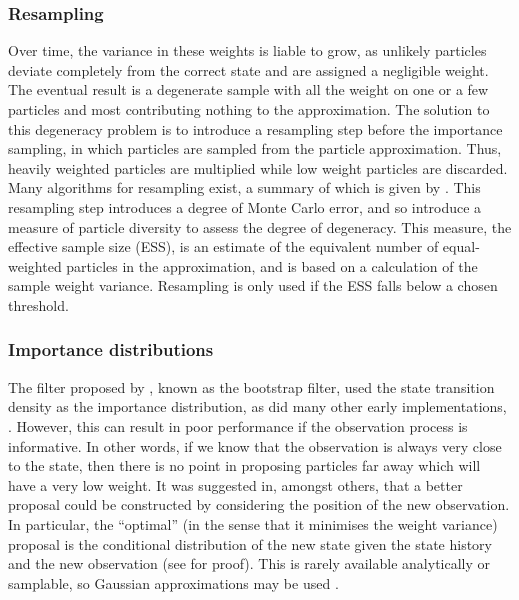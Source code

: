 \subsubsection{Resampling}
Over time, the variance in these weights is liable to grow, as unlikely particles deviate completely from the correct state and are assigned a negligible weight. The eventual result is a degenerate sample with all the weight on one or a few particles and most contributing nothing to the approximation. The solution to this degeneracy problem is to introduce a resampling step before the importance sampling, in which particles are sampled from the particle approximation. Thus, heavily weighted particles are multiplied while low weight particles are discarded. Many algorithms for resampling exist, a summary of which is given by \cite{Doucet2009}. This resampling step introduces a degree of Monte Carlo error, and so \cite{Liu1995} introduce a measure of particle diversity to assess the degree of degeneracy. This measure, the effective sample size (ESS), is an estimate of the equivalent number of equal-weighted particles in the approximation, and is based on a calculation of the sample weight variance. Resampling is only used if the ESS falls below a chosen threshold.

\subsubsection{Importance distributions}
The filter proposed by \cite{Gordon1993}, known as the bootstrap filter, used the state transition density as the importance distribution, as did many other early implementations, \cite{Blake1998,Kitagawa1996}. However, this can result in poor performance if the observation process is informative. In other words, if we know that the observation is always very close to the state, then there is no point in proposing particles far away which will have a very low weight. It was suggested in, amongst others, \cite{Liu1995} that a better proposal could be constructed by considering the position of the new observation. In particular, the ``optimal'' (in the sense that it minimises the weight variance) proposal is the conditional distribution of the new state given the state history and the new observation (see \cite{Doucet2000a} for proof). This is rarely available analytically or samplable, so Gaussian approximations may be used \cite{Doucet2000a}.

